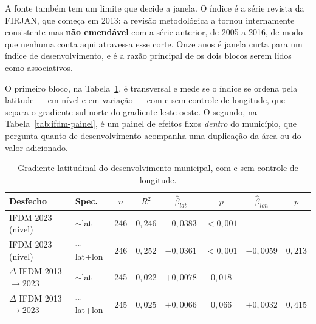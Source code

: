 A fonte também tem um limite que decide a janela. O índice é a série revista da
FIRJAN, que começa em 2013: a revisão metodológica a tornou internamente
consistente mas \textbf{não emendável} com a série anterior, de 2005 a 2016, de
modo que nenhuma conta aqui atravessa esse corte. Onze anos é janela curta para
um índice de desenvolvimento, e é a razão principal de os dois blocos serem
lidos como associativos.

O primeiro bloco, na Tabela~\ref{tab:ifdm-gradiente}, é transversal e mede se o
índice se ordena pela latitude --- em nível e em variação --- com e sem controle
de longitude, que separa o gradiente sul-norte do gradiente leste-oeste. O
segundo, na Tabela~\ref{tab:ifdm-painel}, é um painel de efeitos fixos
\emph{dentro} do município, que pergunta quanto de desenvolvimento acompanha uma
duplicação da área ou do valor adicionado.


\begin{table}[!ht]
\centering
\caption[Gradiente do desenvolvimento municipal]{Gradiente latitudinal do desenvolvimento municipal, com e sem controle de longitude.}
\label{tab:ifdm-gradiente}
\footnotesize
\begin{tabular}{llcccccc}
\toprule
\textbf{Desfecho} & \textbf{Spec.} & \textbf{$n$} & \textbf{$R^2$} & \textbf{$\hat{\beta}_{lat}$} & \textbf{$p$} & \textbf{$\hat{\beta}_{lon}$} & \textbf{$p$} \\
\midrule
IFDM 2023 (nível) & $\sim$lat & 246 & $0{,}246$ & $-0{,}0383$ & $<0{,}001$ & --- & --- \\
IFDM 2023 (nível) & $\sim$lat+lon & 246 & $0{,}252$ & $-0{,}0361$ & $<0{,}001$ & $-0{,}0059$ & $0{,}213$ \\
$\Delta$ IFDM 2013$\rightarrow$2023 & $\sim$lat & 245 & $0{,}022$ & $+0{,}0078$ & $0{,}018$ & --- & --- \\
$\Delta$ IFDM 2013$\rightarrow$2023 & $\sim$lat+lon & 245 & $0{,}025$ & $+0{,}0066$ & $0{,}066$ & $+0{,}0032$ & $0{,}415$ \\
\bottomrule
\end{tabular}
\end{table}

